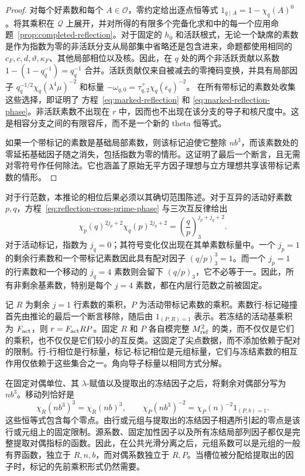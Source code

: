 \documentclass[11pt,a4paper]{article}
\numberwithin{equation}{section}
\numberwithin{figure}{section}
\theoremstyle{definition}
\theoremstyle{remark}
\begin{document}
\begin{proof}
对每个好素数和每个 \(A\in\mathcal O\)，零约定给出逐点恒等式 \(1_{q\mid A}=1-\chi_q(A)^0\)。将其乘积在
\(\mathcal Q\) 上展开，并对所得的有限多个完备化求和中的每一个应用命题~\ref{prop:completed-reflection}。对于固定的 \(h_0\) 和活跃根式，无论一个缺席的素数是作为指数为零的非活跃分支从局部集中省略还是包含进来，命题都使用相同的 \(c_F,c,d,\vartheta,\kappa_F\)、其他局部相位以及核。因此，在 \(q\) 处的两个非活跃贡献以系数
\(1-(1-q_q^{-1})=q_q^{-1}\) 合并。活跃贡献仅来自被减去的零掩码变换，并具有局部因子
\(q_q^{-1/2}\chi_q(\lambda^4\mu)^{-2}\) 和标量
\(-\omega_{q,0}=\tau_{q,2}^{+}\chi_q(\epsilon_q)^{-2}\)。
在所有带标记的素数处收集这些选择，即证明了
方程~\eqref{eq:marked-reflection} 和
\eqref{eq:marked-reflection-phase}。非活跃素数不出现在
\(r\) 中，因而也不出现在该分支的导子和核尺度中。这是相容分支之间的有限容斥，而不是一个新的 theta 恒等式。

如果一个带标记的素数是基础局部素数，则该标记迫使它整除
\(nb^3\)，而该素数处的零延拓基础因子随之消失，包括指数为零的情形。这证明了最后一个断言，且无需对零符号作任何除法。它也涵盖了原始无平方因子理想与立方理想共享该带标记素数的情形。
\end{proof}对于行范数，本推论的相位后果必须以其确切范围陈述。对于互异的活动好素数 \(p,q\)，方程~\eqref{eq:reflection-cross-prime-phase} 与三次互反律给出
\begin{equation}\label{eq:reflection-pair-phase}
 \chi_p(q)^{2j_p+2}\chi_q(p)^{2j_q+2}
       =\left(\frac qp\right)_3^{j_p+j_q+2}.
\end{equation}
对于活动标记，指数为 \(j_q=0\)；其符号变化仅出现在其单素数标量中。一个 \(j_p=1\) 的剩余行素数和一个带标记素数因此具有配对因子 \((q/p)_3^3=1\)。而一个 \(j_p=1\) 的行素数和一个移动的 \(j_q=4\) 素数则会留下 \((q/p)_3\)，它不必等于一。因此，所有非剩余基素数，特别是每个 \(j=4\) 素数，都在内层行范数之前被固定。

记 \(R\) 为剩余 \(j=1\) 行素数的乘积，\(P\) 为活动带标记素数的乘积。素数行-标记碰撞首先由推论的最后一个断言移除，随后由 \(1_{(P,R)=1}\) 表示。若冻结的活动基乘积为 \(F_{\rm act}\)，则 \(r=F_{\rm act}RP\)。固定 \(R\) 和 \(P\) 各自模完整 \(M_{\rm ref}^2\) 的类，而不仅仅是它们的乘积，也不仅仅是它们较小的互反类。这固定了尖点数据，而不添加依赖于配对的限制。行-行相位是行标量，标记-标记相位是元组标量，它们与冻结素数的相互作用仅依赖于这些集合之一。角向导子标量以相同方式分解。

在固定对偶单位、其 \(\lambda\)-赋值以及提取出的冻结因子之后，将剩余对偶部分写为 \(nb^3\)。移动列恰好是
\[
 \chi_R(nb^3)^3=\chi_R(nb)^3,\qquad
 \chi_P(nb^3)^{-2}=\chi_P(n)^{-2}1_{(P,b)=1}.
\]
这些恒等式包含每个零点。由行或元组与提取出的冻结因子相遇所引起的零点是该行或元组上的固定限制。源系数、固定加性因子以及所有冻结局部列因子都仅是完整提取对偶指标的函数。因此，在公共光滑分离之后，元组系数可以是元组的一般有界函数，独立于 \(R,n,b\)，而对偶系数独立于 \(R,P\)。当槽位被分配给提取出的因子时，标记的先前乘积形式仍然需要。
\end{document}
